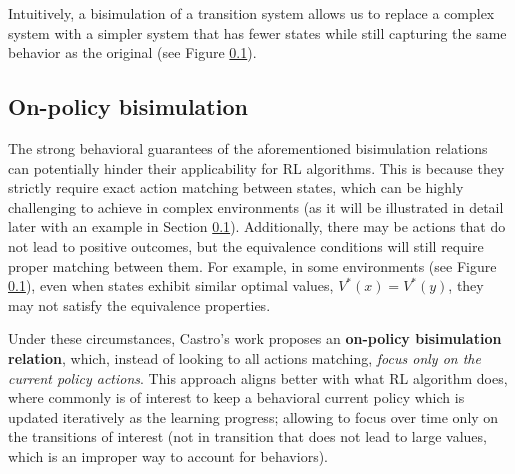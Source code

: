 Intuitively, a bisimulation of a transition system allows us to replace a complex system with a simpler system that has fewer states while still capturing the same behavior as the original (see Figure \ref{}).

\subsection{On-policy bisimulation}

The strong behavioral guarantees of the aforementioned bisimulation relations can potentially hinder their applicability for RL algorithms. This is because they strictly require exact action matching between states, which can be highly challenging to achieve in complex environments (as it will be illustrated in detail later with an example in Section \ref{}). Additionally, there may be actions that do not lead to positive outcomes, but the equivalence conditions will still require proper matching between them. For example, in some environments (see Figure \ref{}), even when states exhibit similar optimal values, $V^*(x) = V^*(y)$, they may not satisfy the equivalence properties.

Under these circumstances, Castro's work \cite{castro2020scalable} proposes an \textbf{on-policy bisimulation relation}, which, instead of looking to all actions matching, \textit{focus only on the current policy actions}. This approach aligns better with what RL algorithm does, where commonly is of interest to keep a behavioral current policy which is updated iteratively as the learning progress; allowing to focus over time only on the transitions of interest (not in transition that does not lead to large values, which is an improper way to account for behaviors).

